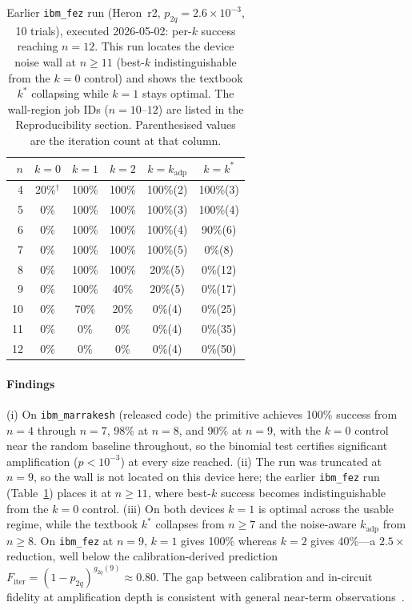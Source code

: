 \documentclass[journal]{IEEEtran}
\begin{document}
\begin{table}[t]
\centering
\caption{Earlier \texttt{ibm\_fez} run (Heron~r2, $p_{2q}=2.6\times10^{-3}$, 10
trials), executed 2026-05-02: per-$k$ success reaching $n{=}12$. This run locates
the device noise wall at $n\!\ge\!11$ (best-$k$ indistinguishable from the $k{=}0$
control) and shows the textbook $k^{*}$ collapsing while $k{=}1$ stays optimal.
The wall-region job IDs ($n{=}10$--$12$) are listed in the Reproducibility
section. Parenthesised values are the iteration count at that column.}
\label{tab:perk}
\small
\begin{tabular}{@{}rccccc@{}}
\toprule
$n$ & $k{=}0$ & $k{=}1$ & $k{=}2$ & $k{=}k_{\mathrm{adp}}$ & $k{=}k^{*}$ \\
\midrule
4  & 20\%$^\dagger$ & 100\% & 100\% & 100\%(2) & 100\%(3) \\
5  & 0\% & 100\% & 100\% & 100\%(3) & 100\%(4) \\
6  & 0\% & 100\% & 100\% & 100\%(4) & 90\%(6) \\
7  & 0\% & 100\% & 100\% & 100\%(5) & 0\%(8) \\
8  & 0\% & 100\% & 100\% & 20\%(5) & 0\%(12) \\
9  & 0\% & 100\% & 40\%  & 20\%(5) & 0\%(17) \\
10 & 0\% & 70\%  & 20\%  & 0\%(4)  & 0\%(25) \\
11 & 0\% & 0\%   & 0\%   & 0\%(4)  & 0\%(35) \\
12 & 0\% & 0\%   & 0\%   & 0\%(4)  & 0\%(50) \\
\bottomrule
\end{tabular}
\end{table}

\paragraph{Findings}
(i) On \texttt{ibm\_marrakesh} (released code) the primitive achieves 100\%
success from $n{=}4$ through $n{=}7$, 98\% at $n{=}8$, and 90\% at $n{=}9$, with
the $k{=}0$ control near the random baseline throughout, so the binomial test
certifies significant amplification ($p<10^{-3}$) at every size reached. (ii) The
run was truncated at $n{=}9$, so the wall is not located on this device here; the
earlier \texttt{ibm\_fez} run (Table~\ref{tab:perk}) places it at $n\!\ge\!11$,
where best-$k$ success becomes indistinguishable from the $k{=}0$ control.
(iii) On both devices $k{=}1$ is optimal across the usable regime, while the
textbook $k^{*}$ collapses from $n\!\ge\!7$ and the noise-aware $k_{\mathrm{adp}}$
from $n\!\ge\!8$. On \texttt{ibm\_fez} at $n{=}9$, $k{=}1$ gives 100\% whereas
$k{=}2$ gives 40\%---a $2.5\times$ reduction, well below the calibration-derived
prediction $F_{\mathrm{iter}}=(1{-}p_{2q})^{g_{2q}(9)}\approx0.80$. The gap
between calibration and in-circuit fidelity at amplification depth is consistent
with general near-term observations~\cite{temme2017}.
\end{document}
